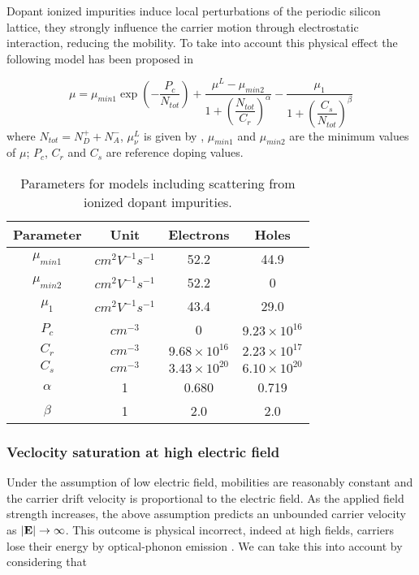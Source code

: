 Dopant ionized impurities induce local perturbations of the periodic silicon lattice, they strongly influence the carrier motion through electrostatic interaction, reducing the mobility. To take into account this physical effect the following model has been proposed in \cite{Masetti:MobDop}


\begin{equation}
\label{eq: mobility impurities}
\mu = \mu_{min1}\exp\left( 	- \dfrac{P_c}{N_{tot}}\right)
 + \dfrac{\mu^L-\mu_{min2}}{1 + \left( \dfrac{N_{tot}}{C_r} \right)^{\alpha} } 
 - \dfrac{\mu_1}{1 + \left( \dfrac{C_s}{N_{tot}} \right)^{\beta} } 
\end{equation}
where $N_{tot} = N_D^+ + N_A^-$, $\mu_\nu^L$ is given by , $\mu_{min1}$ and $\mu_{min2}$  are the minimum values of $\mu$; $P_c$, $C_r$ and $C_s$ are reference doping values.


\begin{table}[!h]
\centering
\begin{tabular}{cccc}
\toprule
Parameter & Unit & Electrons & Holes \\
\midrule
$\mu_{min1}$ & $cm^2V^{-1}s^{-1}$ & 52.2 & 44.9\\
$\mu_{min2}$ & $cm^2V^{-1}s^{-1}$ & 52.2 & 0\\
$\mu_1$ & $cm^2V^{-1}s^{-1}$ & 43.4 & 29.0 \\
$P_c$ & $cm^{-3}$ & 0 & $9.23\times 10^{16}$\\
$C_r$ & $cm^{-3}$ &  $9.68\times 10^{16}$ & $2.23\times 10^{17}$ \\
$C_s$ & $cm^{-3}$ & $3.43\times 10^{20}$ & $6.10\times 10^{20}$\\
$\alpha$& 1 & 0.680 & 0.719  \\
$\beta$& 1 & 2.0 & 2.0 \\
\bottomrule
\end{tabular}
\caption{Parameters for models including scattering from ionized dopant impurities.}
\end{table}


\subsubsection{Veclocity saturation at high electric field}

Under the assumption of low electric field, mobilities are reasonably constant and the carrier drift velocity is proportional to the electric field. As the applied field strength increases, the above assumption predicts an unbounded carrier velocity as $|\mathbf{E}| \rightarrow \infty$. This outcome is physical incorrect, indeed at high fields, carriers lose their energy by optical-phonon emission \cite{ModernVLSIdevices}. We can take this into account by considering that

